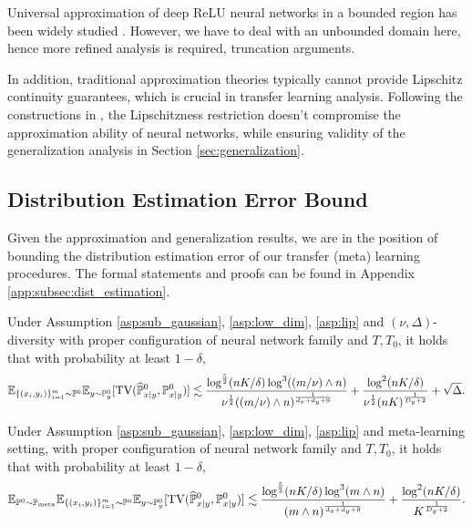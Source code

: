 \documentclass[11pt]{article}
\numberwithin{equation}{section}
\newcommand{\Pmeta}{\mathbb{P}_{\text{meta}}}
\renewcommand{\P}{\mathbb{P}}
\begin{document}
Universal approximation of deep ReLU neural networks in a bounded region has been widely studied \citep{yarotsky2017error,schmidt2020nonparametric}.
However, we have to deal with an unbounded domain here, hence more refined analysis is required,  truncation arguments. 

In addition, traditional approximation theories typically cannot provide Lipschitz continuity guarantees, which is crucial in transfer learning analysis.
Following the constructions in \citet{chen2023score}, the Lipschitzness restriction doesn't compromise the approximation ability of neural networks, while ensuring validity of the generalization analysis in Section \ref{sec:generalization}.

\subsection{Distribution Estimation Error Bound}

Given the approximation and generalization results, we are in the position of bounding the distribution estimation error of our transfer (meta) learning procedures.
The formal statements and proofs can be found in Appendix \ref{app:subsec:dist_estimation}.

\begin{thm}
\label{thm:distribution_diversity_informal}
    Under Assumption \ref{asp:sub_gaussian}, \ref{asp:low_dim}, \ref{asp:lip} and $(\nu,\Delta)$-diversity with proper configuration of neural network family and $T,T_0$, it holds that with probability at least $1-\delta$,
    \begin{equation}
        \E_{\{(x_i,y_i)\}_{i=1}^m\sim\P^0}\E_{y\sim\P^0_y} [\mathrm{TV}(\widehat{\P}^0_{x|y},\P^0_{x|y})]
        \lesssim \frac{\log^{\frac{5}{2}}(nK/\delta)\log^3((m/\nu)\wedge n)}{\nu^{\frac{1}{2}}((m/\nu)\wedge n)^{\frac{1}{d_x+d_y+9}}}+\frac{\log^2(nK/\delta)}{\nu^{\frac{1}{2}}(nK)^{\frac{1}{D_y+2}}}+\sqrt{\Delta}.
    \end{equation}
\end{thm}


\begin{thm}
\label{thm:distribution_informal}
    Under Assumption \ref{asp:sub_gaussian}, \ref{asp:low_dim}, \ref{asp:lip} and meta-learning setting, with proper configuration of neural network family and $T,T_0$, it holds that with probability at least $1-\delta$,
    \begin{equation}
        \E_{\P^0\sim\Pmeta}\E_{\{(x_i,y_i)\}_{i=1}^m\sim \P^0}\E_{y\sim\P^0_y} [\mathrm{TV}(\widehat{\P}^0_{x|y},\P_{x|y}^0)]
        \lesssim \frac{\log^{\frac{5}{2}}(nK/\delta)\log^3(m\wedge n)}{(m\wedge n)^{\frac{1}{d_x+d_y+9}}}+\frac{\log^2(nK/\delta)}{K^{\frac{1}{D_y+2}}}.
    \end{equation}
\end{thm}
\end{document}
